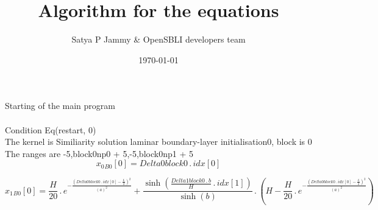 \documentclass{article}
\title{Algorithm for the equations}
\author{Satya P Jammy \& OpenSBLI developers team}
\date{\today}
\begin{document}
\maketitle
\noindent Starting of the main program\\
\\\noindent Condition Eq(restart, 0)\\\noindent The kernel is Similiarity solution laminar boundary-layer initialisation0, block is 0\\\noindent The ranges are -5,block0np0 + 5,-5,block0np1 + 5\\\begin{dmath}{x_{0}{_{B0}}}[{0}] = Delta0block0 \,.\, {idx}[{0}]\end{dmath}

\begin{dmath}{x_{1}{_{B0}}}[{0}] = \frac{H}{20} \,.\, e^{- \frac{\left(Delta0block0 \,.\, {idx}[{0}] - \frac{L}{2} \right)^{2}}{\left(a \right)^{2}}} + \frac{\sinh{\left (\frac{Delta1block0 \,.\, b}{H} \,.\, {idx}[{1}] \right )}}{\sinh{\left (b 
\right )}} \,.\, \left(H - \frac{H}{20} \,.\, e^{- \frac{\left(Delta0block0 \,.\, {idx}[{0}] - \frac{L}{2} \right)^{2}}{\left(a \right)^{2}}}\right)\end{dmath}
\end{document}
